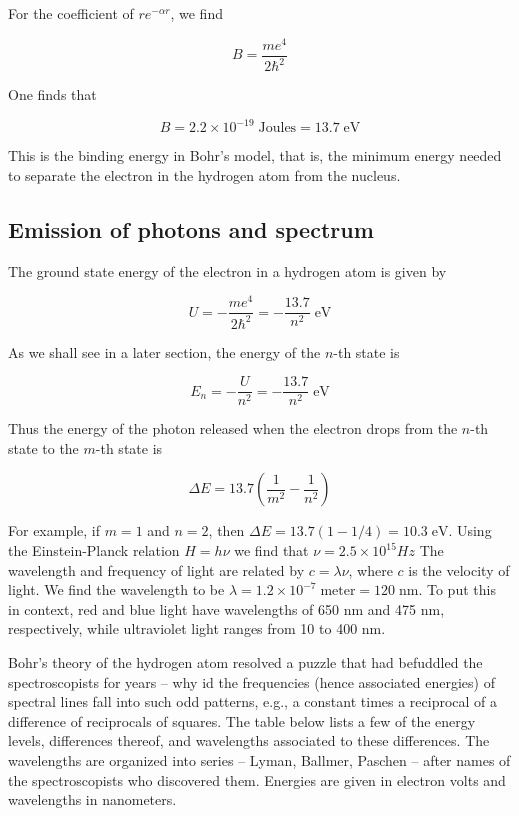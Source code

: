 For the coefficient of $re^{-\alpha r}$, we find

\begin{equation}
B = \frac{ me^4 }{ 2\hbar^2 }
\end{equation}

One finds that

\begin{equation}
B = 2.2\times 10^{-19}\;\text{Joules} = 13.7\;\text{eV}
\end{equation}

This is the binding energy in Bohr's model, that is, the minimum energy needed to separate the electron in the hydrogen atom from the nucleus.

\subsection{Emission of photons and spectrum}


The ground state energy of the electron in a hydrogen atom is given by

\begin{equation}
U = -\frac{me^4 }{ 2\hbar^2 } = -\frac{13.7}{n^2}\;\text{eV}
\end{equation}

As we shall see in a later section, the energy of the $n$-th state is

\begin{equation}
E_n = -\frac{U}{n^2} = -\frac{13.7}{n^2}\;\text{eV}
\end{equation}

Thus the energy of the photon released when the electron drops from the $n$-th state to the $m$-th state is

\begin{equation}
\Delta E = 13.7\left(\frac{1}{m^2} - \frac{1}{n^2}\right)
\end{equation}

For example, if $m = 1$ and $n = 2$, then $\Delta E = 13.7(1-1/4) = 10.3\;\text{eV}$.  Using the Einstein-Planck relation $H = h\nu$ we find that $\nu = 2.5\times 10^{15} Hz$  The wavelength and frequency of light are related by  $c = \lambda \nu$, where $c$ is the velocity of light.  We find the wavelength to be $\lambda = 1.2\times 10^{-7}\;\text{meter}  =120\;\text{nm}$. To put this in context, red and blue light have wavelengths of 650 nm and 475 nm, respectively, while ultraviolet light ranges from 10 to 400 nm.

Bohr's theory of the hydrogen atom resolved a puzzle that had befuddled the spectroscopists for years -- why id the frequencies (hence associated energies) of spectral lines fall into such odd patterns, e.g., a constant times a reciprocal of a difference of reciprocals of squares.  The table below lists a few of the energy levels, differences thereof, and wavelengths associated to these differences.  The wavelengths are organized into series -- Lyman, Ballmer, Paschen -- after names of the spectroscopists who discovered them.  Energies are given in electron volts and wavelengths in nanometers.


